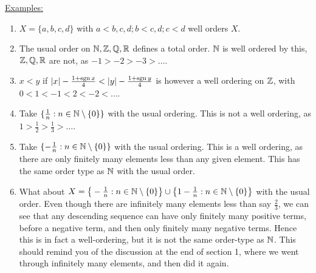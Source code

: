 \documentclass[10pt,a4paper]{article}
\begin{document}
\hspace*{-1em}\underline{Examples:}
\begin{enumerate}
\item $X = \{a,b,c,d\}$ with $a<b,c,d; b<c,d; c<d$ well orders $X$.
\item The usual order on $\mathbb{N}, \mathbb{Z}, \mathbb{Q}, \mathbb{R}$ defines a total order. $\mathbb{N}$ is well ordered by this, $\mathbb{Z},\mathbb{Q},\mathbb{R}$ are not, as $-1>-2>-3>\ldots$.
\item $x<y$ if $|x|-\frac{1+\operatorname{sgn} x}{4} < |y|-\frac{1+\operatorname{sgn} y}{4}$ is however a well ordering on $\mathbb{Z}$, with $0<1<-1<2<-2<\ldots$.
\item Take $\{\frac1n: n \in\mathbb{N}\setminus\{0\}\}$ with the usual ordering. This is not a well ordering, as $1>\frac12>\frac13>\ldots$.
\item Take $\{-\frac1n: n \in\mathbb{N}\setminus\{0\}\}$ with the usual ordering. This is a well ordering, as there are only finitely many elements less than any given element. This has the same order type as $\mathbb{N}$ with the usual order.
\item What about $X = \big\{-\frac1n: n \in \mathbb{N}\setminus\{0\}\big\}\cup\big\{1-\frac1n:n \in \mathbb{N}\setminus\{0\}\big\}$ with the usual order. Even though there are infinitely many elements less than say $\frac23$, we can see that any descending sequence can have only finitely many positive terms, before a negative term, and then only finitely many negative terms. Hence this is in fact a well-ordering, but it is not the same order-type as $\mathbb{N}$. This should remind you of the discussion at the end of section 1, where we went through infinitely many elements, and then did it again.
\end{enumerate}
\end{document}
